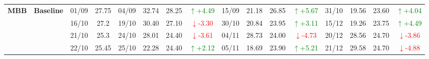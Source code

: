 {\begin{longtable}{llcc|cccc|cccc|cccc}
\multirow{4}{*}{\textbf{MBB}}
& \textbf{Baseline}
& 01/09 & 27.75 & 04/09 & 32.74 & 28.25 & \textcolor{green}{\(\uparrow\)+4.49} & 15/09 & 21.18 & 26.85 & \textcolor{green}{\(\uparrow\)+5.67} & 31/10 & 19.56 & 23.60 & \textcolor{green}{\(\uparrow\)+4.04} \\
& & 16/10 & 27.2 & 19/10 & 30.40 & 27.10 & \textcolor{red}{\(\downarrow\)-3.30} & 30/10 & 20.84 & 23.95 & \textcolor{green}{\(\uparrow\)+3.11} & 15/12 & 19.26 & 23.75 & \textcolor{green}{\(\uparrow\)+4.49} \\
& & 21/10 & 25.3 & 24/10 & 28.01 & 24.40 & \textcolor{red}{\(\downarrow\)-3.61} & 04/11 & 28.73 & 24.00 & \textcolor{red}{\(\downarrow\)-4.73} & 20/12 & 28.56 & 24.70 & \textcolor{red}{\(\downarrow\)-3.86} \\
& & 22/10 & 25.45 & 25/10 & 22.28 & 24.40 & \textcolor{green}{\(\uparrow\)+2.12} & 05/11 & 18.69 & 23.90 & \textcolor{green}{\(\uparrow\)+5.21} & 21/12 & 29.58 & 24.70 & \textcolor{red}{\(\downarrow\)-4.88} \\
\midrule

\end{longtable}
}